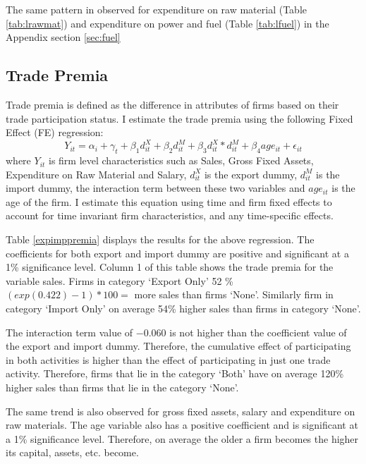 \documentclass[12pt]{article}
\begin{document}
The same pattern in observed for expenditure on raw material (Table \ref{tab:lrawmat}) and
expenditure on power and fuel (Table \ref{tab:lfuel}) in the Appendix
section \ref{sec:fuel}
\subsection{Trade Premia}
Trade premia is defined as the difference in
attributes of firms based on their trade participation status. I
estimate the trade premia using the following Fixed Effect (FE) regression:
\begin{equation}
\label{FE}
 Y_{it} = \alpha_i + \gamma_{t} + \beta_{1} d_{it}^{X}+ \beta_{2} d_{it}^{M}+
\beta_{3} d_{it}^{X}*d_{it}^{M} + \beta_{4} age_{it} + \epsilon_{it}
\end{equation}
where $Y_{it}$ is firm level characteristics such as Sales, Gross
Fixed Assets, Expenditure on Raw Material and Salary, $d_{it}^X$ is
the export dummy, $d_{it}^M$ is
the import  dummy, the interaction term between these two variables
and $age_{it}$ is the age of the firm. I estimate this equation using
time and firm fixed
effects to account for time invariant firm characteristics, and any
time-specific effects.

Table \ref{expimppremia} displays the results for the above
regression. The coefficients for both export and import dummy are positive
and significant at a 1\% significance level. Column 1 of this table
shows the trade premia for the variable sales. Firms
in category `Export Only'   52 \% $(exp(0.422) -1)* 100 = $ more
sales than firms `None'. Similarly firm in category `Import Only'
on average 54\% higher sales than firms in category `None'. 

The interaction term value of $-0.060$ is not higher than the coefficient
value of the export and import dummy. Therefore, the cumulative
effect of participating in both activities is higher than the effect
of participating in just one trade activity. Therefore, firms that lie
in the category `Both' have  on average 120\% higher sales than firms that
lie in the category `None'. 

\begin{center}

\end{center}


 
 The same trend
is also observed for  gross fixed assets, salary and expenditure on
raw materials.  The age variable also
has a positive coefficient and is significant at a 1\% significance
level. Therefore,  on average the older a firm becomes the higher its capital,
assets, etc. become. 
\end{document}

